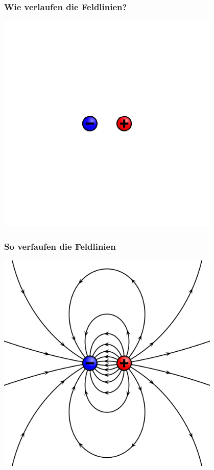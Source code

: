 \begin{frame}
    \frametitle{Wie verlaufen die Feldlinien?}
    \begin{center}
        \includegraphics[width=0.8\textwidth]{a08/VFPt_dipole_electric_ohne.png}
        \tiny \hyperlink{refs}{\cite{wm}} \\[1em] \large
    \end{center}
\end{frame}

\begin{frame}
    \frametitle{So verfaufen die Feldlinien}
    \begin{center}
        \includegraphics[width=0.8\textwidth]{a08/VFPt_dipole_electric_mit.png}
        \tiny \hyperlink{refs}{\cite{wm}} \\[1em] \large
    \end{center}
\end{frame}

